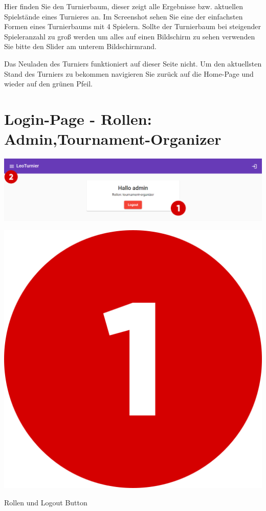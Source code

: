 Hier finden Sie den Turnierbaum, dieser zeigt alle Ergebnisse bzw. aktuellen Spielstände eines Turnieres an.
Im Screenshot sehen Sie eine der einfachsten Formen eines Turnierbaums mit 4 Spielern. Sollte der Turnierbaum bei
steigender Spieleranzahl zu groß werden um alles auf einen Bildschirm zu sehen verwenden Sie bitte den Slider am unterem Bildschirmrand.

Das Neuladen des Turniers funktioniert auf dieser Seite nicht. Um den aktuellsten Stand des Turniers zu bekommen navigieren Sie zurück auf die Home-Page und wieder auf den grünen Pfeil.
\section{Login-Page - Rollen: Admin,Tournament-Organizer}
\includegraphics[scale=0.4]{pics/user-guide/login-page.PNG}
\bigskip

\includegraphics[scale=0.05]{pics/user-guide/numbers/number-1.png} \begin{LARGE} Rollen und Logout Button \end{LARGE}

